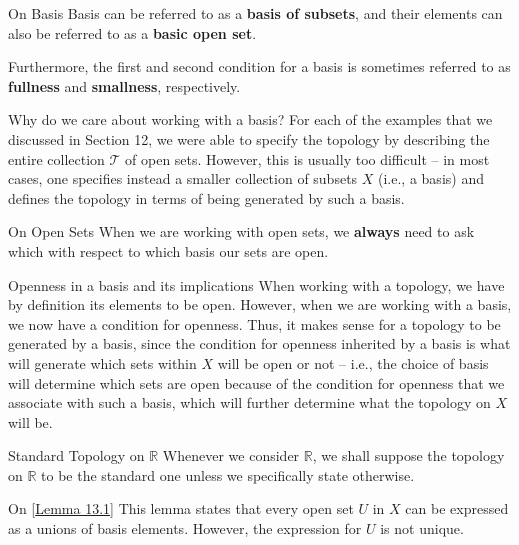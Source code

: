 \begin{remarkBox}{On Basis}
    Basis can be referred to as a \textbf{basis of subsets}, and their 
    elements can also be referred to as a \textbf{basic open set}.

    \baseSkip   

    Furthermore, the first and second condition for a basis is sometimes    referred to as \textbf{fullness} and \textbf{smallness}, respectively.
\end{remarkBox}

\begin{remarkBox}{Why do we care about working with a basis?}
    For each of the examples that we discussed in Section 12, we were able to specify the topology by describing the entire 
    collection \( \mathcal{T} \) of open sets. However, this is usually too difficult -- in most cases, one specifies instead 
    a smaller collection of subsets \( X \) (i.e., a basis) and defines the topology in terms of being generated by such a basis.
\end{remarkBox}

\begin{remarkBox}{On Open Sets}
    When we are working with open sets, we \textbf{always} need to ask which 
    with respect to which basis our sets are open.
\end{remarkBox}

\begin{remarkBox}{Openness in a basis and its implications}
    When working with a topology, we have by definition its elements to be open.
    However, when we are working with a basis, we now have a condition for 
    openness.
    Thus, it makes sense for a topology to be generated by a basis, since the 
    condition for openness inherited by a basis is what will generate which 
    sets within \( X \) will be open or not -- i.e., the choice of basis will 
    determine which sets are open because of the condition for openness that 
    we associate with such a basis, which will further determine what the 
    topology on \( X \) will be.
\end{remarkBox}

\begin{remarkBox}{Standard Topology on \( \mathbb{R} \)}
    Whenever we consider \( \mathbb{R} \), we shall suppose the topology on 
    \( \mathbb{R} \) to be the standard one unless we specifically state 
    otherwise.
\end{remarkBox}

\begin{remarkBox}{On [\hyperlink{lem:13.1}{Lemma 13.1}]}
    This lemma states that every open set \( U \) in \( X \) can be expressed 
    as a unions of basis elements.
    However, the expression for \( U \) is not unique.
\end{remarkBox}

